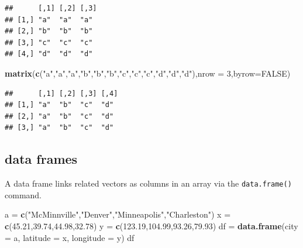 \documentclass[
]{book}
\newenvironment{Shaded}{\begin{snugshade}}{\end{snugshade}}
\newcommand{\AttributeTok}[1]{\textcolor[rgb]{0.13,0.29,0.53}{#1}}
\newcommand{\ConstantTok}[1]{\textcolor[rgb]{0.56,0.35,0.01}{#1}}
\newcommand{\DecValTok}[1]{\textcolor[rgb]{0.00,0.00,0.81}{#1}}
\newcommand{\FloatTok}[1]{\textcolor[rgb]{0.00,0.00,0.81}{#1}}
\newcommand{\FunctionTok}[1]{\textcolor[rgb]{0.13,0.29,0.53}{\textbf{#1}}}
\newcommand{\NormalTok}[1]{#1}
\newcommand{\OtherTok}[1]{\textcolor[rgb]{0.56,0.35,0.01}{#1}}
\newcommand{\StringTok}[1]{\textcolor[rgb]{0.31,0.60,0.02}{#1}}
\theoremstyle{definition}
\theoremstyle{definition}
\theoremstyle{definition}
\theoremstyle{definition}
\theoremstyle{remark}
\begin{document}
\begin{verbatim}
##      [,1] [,2] [,3]
## [1,] "a"  "a"  "a" 
## [2,] "b"  "b"  "b" 
## [3,] "c"  "c"  "c" 
## [4,] "d"  "d"  "d"
\end{verbatim}

\begin{Shaded}
\begin{Highlighting}[]
\FunctionTok{matrix}\NormalTok{(}\FunctionTok{c}\NormalTok{(}\StringTok{"a"}\NormalTok{,}\StringTok{"a"}\NormalTok{,}\StringTok{"a"}\NormalTok{,}\StringTok{"b"}\NormalTok{,}\StringTok{"b"}\NormalTok{,}\StringTok{"b"}\NormalTok{,}\StringTok{"c"}\NormalTok{,}\StringTok{"c"}\NormalTok{,}\StringTok{"c"}\NormalTok{,}\StringTok{"d"}\NormalTok{,}\StringTok{"d"}\NormalTok{,}\StringTok{"d"}\NormalTok{),}\AttributeTok{nrow =} \DecValTok{3}\NormalTok{,}\AttributeTok{byrow=}\ConstantTok{FALSE}\NormalTok{)}
\end{Highlighting}
\end{Shaded}

\begin{verbatim}
##      [,1] [,2] [,3] [,4]
## [1,] "a"  "b"  "c"  "d" 
## [2,] "a"  "b"  "c"  "d" 
## [3,] "a"  "b"  "c"  "d"
\end{verbatim}

\subsection*{data frames}\label{data-frames}

A data frame links related vectors as columns in an array via the \texttt{data.frame()} command.

\begin{Shaded}
\begin{Highlighting}[]
\NormalTok{a }\OtherTok{=} \FunctionTok{c}\NormalTok{(}\StringTok{"McMinnville"}\NormalTok{,}\StringTok{"Denver"}\NormalTok{,}\StringTok{"Minneapolis"}\NormalTok{,}\StringTok{"Charleston"}\NormalTok{)}
\NormalTok{x }\OtherTok{=} \FunctionTok{c}\NormalTok{(}\FloatTok{45.21}\NormalTok{,}\FloatTok{39.74}\NormalTok{,}\FloatTok{44.98}\NormalTok{,}\FloatTok{32.78}\NormalTok{)}
\NormalTok{y }\OtherTok{=} \FunctionTok{c}\NormalTok{(}\FloatTok{123.19}\NormalTok{,}\FloatTok{104.99}\NormalTok{,}\FloatTok{93.26}\NormalTok{,}\FloatTok{79.93}\NormalTok{)}
\NormalTok{df }\OtherTok{=} \FunctionTok{data.frame}\NormalTok{(}\AttributeTok{city =}\NormalTok{ a, }\AttributeTok{latitude =}\NormalTok{ x, }\AttributeTok{longitude =}\NormalTok{ y)}
\NormalTok{df}
\end{Highlighting}
\end{Shaded}
\end{document}
